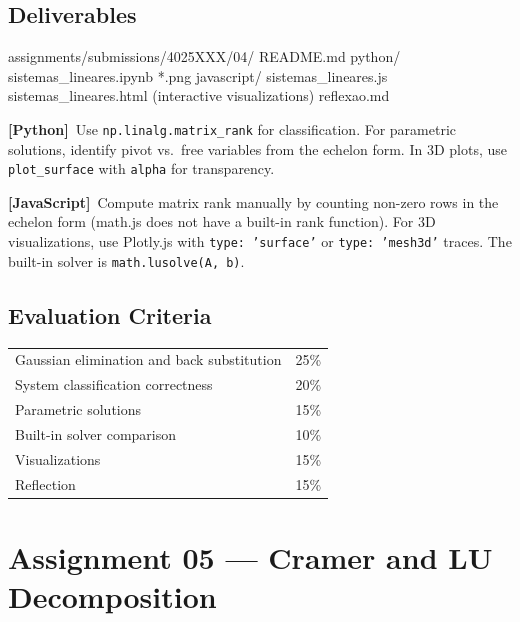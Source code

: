 \documentclass[a4paper,11pt]{article}
\newcommand{\pylabel}{\textcolor{pyborder}{\textbf{[Python]}}}
\newcommand{\jslabel}{\textcolor{jsborder}{\textbf{[JavaScript]}}}
\begin{document}
\subsection{Deliverables}

\begin{code}
assignments/submissions/4025XXX/04/
  README.md
  python/
    sistemas_lineares.ipynb
    *.png
  javascript/
    sistemas_lineares.js
    sistemas_lineares.html    (interactive visualizations)
  reflexao.md
\end{code}

\begin{hintbox}
  \pylabel\ Use \texttt{np.linalg.matrix\_rank} for classification. For parametric solutions, identify pivot vs.\ free variables from the echelon form. In 3D plots, use \texttt{plot\_surface} with \texttt{alpha} for transparency.

  \medskip

  \jslabel\ Compute matrix rank manually by counting non-zero rows in the echelon form (math.js does not have a built-in rank function). For 3D visualizations, use Plotly.js with \texttt{type: 'surface'} or \texttt{type: 'mesh3d'} traces. The built-in solver is \texttt{math.lusolve(A, b)}.
\end{hintbox}

\subsection{Evaluation Criteria}

\begin{tabularx}{\textwidth}{X r}
  Gaussian elimination and back substitution & 25\% \\
  System classification correctness & 20\% \\
  Parametric solutions & 15\% \\
  Built-in solver comparison & 10\% \\
  Visualizations & 15\% \\
  Reflection & 15\% \\
\end{tabularx}

\newpage

\section{Assignment 05 --- Cramer and LU Decomposition}
\end{document}
